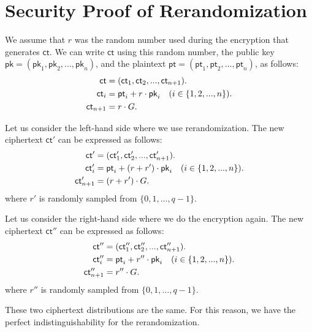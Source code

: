 \documentclass{article}
\begin{document}
\section{Security Proof of Rerandomization}
We assume that $r$ was the random number used during the encryption that generates $\mathsf{ct}$. We can write $\mathsf{ct}$ using this random number, the public key $\mathsf{pk}=(\mathsf{pk}_1, \mathsf{pk}_2, ..., \mathsf{pk}_n)$, and the plaintext $\mathsf{pt}=(\mathsf{pt}_1, \mathsf{pt}_2, ..., \mathsf{pt}_n)$, as follows:
\begin{align}
\mathsf{ct}&=(\mathsf{ct}_1, \mathsf{ct}_2, ..., \mathsf{ct}_{n+1}).\notag\\
\mathsf{ct}_i&=\mathsf{pt}_i+r\cdot\mathsf{pk}_i~~~(i\in\{1,2,...,n\}).\notag\\
\mathsf{ct}_{n+1}&=r\cdot G.\notag
\end{align}

Let us consider the left-hand side where we use rerandomization. The new ciphertext $\mathsf{ct}'$ can be expressed as follows:
\begin{align}
\mathsf{ct}'&=(\mathsf{ct}'_1, \mathsf{ct}'_2, ..., \mathsf{ct}'_{n+1}).\notag\\
\mathsf{ct}'_i&=\mathsf{pt}_i+(r+r')\cdot\mathsf{pk}_i~~~(i\in\{1,2,...,n\}).\notag\\
\mathsf{ct}'_{n+1}&=(r+r')\cdot G.\notag
\end{align}
where $r'$ is randomly sampled from $\{0,1,...,q-1\}$. 

Let us consider the right-hand side where we do the encryption again. The new ciphertext $\mathsf{ct}''$ can be expressed as follows:
\begin{align}
\mathsf{ct}''&=(\mathsf{ct}''_1, \mathsf{ct}''_2, ..., \mathsf{ct}''_{n+1}).\notag\\
\mathsf{ct}''_i&=\mathsf{pt}_i+r''\cdot\mathsf{pk}_i~~~(i\in\{1,2,...,n\}).\notag\\
\mathsf{ct}''_{n+1}&=r''\cdot G.\notag
\end{align}
where $r''$ is randomly sampled from $\{0,1,...,q-1\}$. 

These two ciphertext distributions are the same. For this reason, we have the perfect indistinguishability for the rerandomization.
\end{document}
